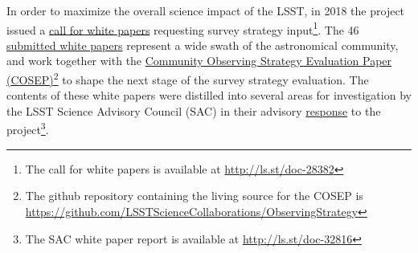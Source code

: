 In order to maximize the overall science impact of the LSST, in 2018 the project issued a \href{ http://ls.st/doc-28382}{call for white papers} requesting survey strategy input\footnote{The call for white papers is available at \href{ http://ls.st/doc-28382}{http://ls.st/doc-28382}}. The 46 \href{https://www.lsst.org/submitted-whitepaper-2018}{submitted white papers} represent a wide swath of the astronomical community, and work together with the \href{https://github.com/LSSTScienceCollaborations/ObservingStrategy/raw/master/whitepaper/releases/LSST_Observing_Strategy_White_Paper_v1.0.pdf}{Community Observing Strategy Evaluation Paper (COSEP)}\footnote{The github repository containing the living source for the COSEP is \href{https://github.com/LSSTScienceCollaborations/ObservingStrategy}{https://github.com/LSSTScienceCollaborations/ObservingStrategy}} to shape the next stage of the survey strategy evaluation. The contents of these white papers were distilled into several areas for investigation by the LSST Science Advisory Council (SAC) in their advisory \href{http://ls.st/doc-32816}{response} to the project\footnote{The SAC white paper report is available at \href{http://ls.st/doc-32816}{http://ls.st/doc-32816}}.

